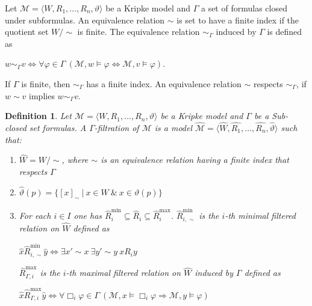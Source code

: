\documentclass[a4paper]{article}
\theoremstyle{defin}
\newtheorem{defin}{Definition}
\theoremstyle{theorem}
\theoremstyle{prop}
\theoremstyle{lemma}
\theoremstyle{ex}
\theoremstyle{col}
\begin{document}
Let $\mathcal{M} = \langle W, R_1, \dots, R_n, \vartheta \rangle$ be a Kripke model and $\Gamma$ a set of formulas closed under subformulas. An equivalence relation $\sim$ is set to have a finite index if the quotient set $W / \sim$ is finite. The equivalence relation $\sim_{\Gamma}$ induced by $\Gamma$ is defined as

\begin{center}
  $w \sim_{\Gamma} v \Leftrightarrow \forall \varphi \in \Gamma \: (\mathcal{M}, w \models \varphi \Leftrightarrow \mathcal{M}, v \models \varphi)$.
\end{center}

If $\Gamma$ is finite, then $\sim_{\Gamma}$ has a finite index. An equivalence relation $\sim$ respects $\sim_{\Gamma}$, if $w \sim v$ implies $w \sim_{\Gamma} v$.

\begin{defin}
  Let $\mathcal{M} = \langle W, R_1, \dots, R_n, \vartheta \rangle$ be a Kripke model and $\Gamma$ be a Sub-closed set formulas. A $\Gamma$-filtration of $\mathcal{M}$ is a model
  $\widehat{\mathcal{M}} = \langle \widehat{W}, \widehat{R_1}, \dots, \widehat{R_n}, \widehat{\vartheta} \rangle$ such that:
  \begin{enumerate}
    \item $\widehat{W} = W / \sim$, where $\sim$ is an equivalence relation having a finite index that respects $\Gamma$
    \item $\widehat{\vartheta}(p) = \{ [x]_{\sim} \: | \: x \in W \: \& \: x \in \vartheta(p)\}$
    \item For each $i \in I$ one has $\widehat{R}_i^{\text{min}} \subseteq \widehat{R}_i \subseteq \widehat{R}_i^{\text{max}}$. $\widehat{R}_{i, \sim}^{\text{min}}$ is the $i$-th minimal filtered relation on $\widehat{W}$ defined as
    \begin{center}
      $\hat{x} \widehat{R}_{i, \sim}^{\text{min}} \hat{y} \Leftrightarrow \exists x' \sim x \: \exists y' \sim y \: x R_i y$
    \end{center}
    $\widehat{R}_{\Gamma,i}^{\text{max}}$ is the $i$-th maximal filtered relation on $\widehat{W}$ induced by $\Gamma$ defined as
    \begin{center}
      $\hat{x} \widehat{R}_{\Gamma,i}^{\text{max}} \hat{y} \Leftrightarrow \forall \Box_i \varphi \in \Gamma \: (\mathcal{M}, x \models \Box_i \varphi \Rightarrow \mathcal{M}, y \models \varphi)$
    \end{center}
  \end{enumerate}
\end{defin}
\end{document}
